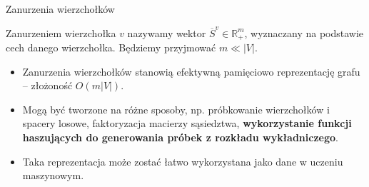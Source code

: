 \begin{frame}[squeeze]{Zanurzenia wierzchołków}
    \begin{definicja}
        Zanurzeniem wierzchołka $v$ nazywamy wektor $\overline{S}^v \in \mathbb{R}^m_{+}$, wyznaczany na podstawie cech danego wierzchołka. Będziemy przyjmować $m \ll |V|$.
    \end{definicja}

    \begin{itemize}
        \setlength\itemsep{1em}
        \item Zanurzenia wierzchołków stanowią efektywną pamięciowo reprezentację grafu -- złożoność $O(m|V|)$. 
        \item Mogą być tworzone na różne sposoby, np. próbkowanie wierzchołków i spacery losowe, faktoryzacja macierzy sąsiedztwa, \textbf{wykorzystanie funkcji haszujących do generowania próbek z rozkładu wykładniczego}.
        \item Taka reprezentacja może zostać łatwo wykorzystana jako dane w uczeniu maszynowym. 
    \end{itemize}
\end{frame}